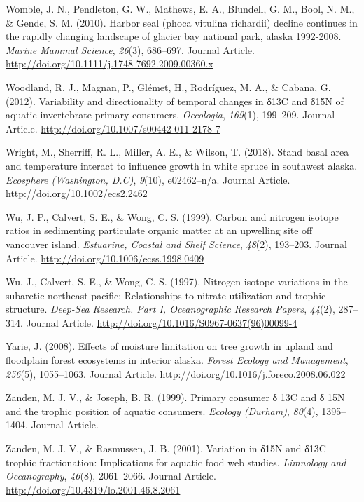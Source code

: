 \documentclass [11pt, proquest] {uwthesis}[2015/03/03]
\begin{document}
\hypertarget{ref-Womble2010}{}
Womble, J. N., Pendleton, G. W., Mathews, E. A., Blundell, G. M., Bool,
N. M., \& Gende, S. M. (2010). Harbor seal (phoca vitulina richardii)
decline continues in the rapidly changing landscape of glacier bay
national park, alaska 1992-2008. \emph{Marine Mammal Science},
\emph{26}(3), 686--697. Journal Article.
\url{http://doi.org/10.1111/j.1748-7692.2009.00360.x}

\hypertarget{ref-Woodland2012}{}
Woodland, R. J., Magnan, P., Glémet, H., Rodríguez, M. A., \& Cabana, G.
(2012). Variability and directionality of temporal changes in δ13C and
δ15N of aquatic invertebrate primary consumers. \emph{Oecologia},
\emph{169}(1), 199--209. Journal Article.
\url{http://doi.org/10.1007/s00442-011-2178-7}

\hypertarget{ref-Wright2018}{}
Wright, M., Sherriff, R. L., Miller, A. E., \& Wilson, T. (2018). Stand
basal area and temperature interact to influence growth in white spruce
in southwest alaska. \emph{Ecosphere (Washington, D.C)}, \emph{9}(10),
e02462--n/a. Journal Article. \url{http://doi.org/10.1002/ecs2.2462}

\hypertarget{ref-Wu1999}{}
Wu, J. P., Calvert, S. E., \& Wong, C. S. (1999). Carbon and nitrogen
isotope ratios in sedimenting particulate organic matter at an upwelling
site off vancouver island. \emph{Estuarine, Coastal and Shelf Science},
\emph{48}(2), 193--203. Journal Article.
\url{http://doi.org/10.1006/ecss.1998.0409}

\hypertarget{ref-Wu1997}{}
Wu, J., Calvert, S. E., \& Wong, C. S. (1997). Nitrogen isotope
variations in the subarctic northeast pacific: Relationships to nitrate
utilization and trophic structure. \emph{Deep-Sea Research. Part I,
Oceanographic Research Papers}, \emph{44}(2), 287--314. Journal Article.
\url{http://doi.org/10.1016/S0967-0637(96)00099-4}

\hypertarget{ref-Yarie2008}{}
Yarie, J. (2008). Effects of moisture limitation on tree growth in
upland and floodplain forest ecosystems in interior alaska. \emph{Forest
Ecology and Management}, \emph{256}(5), 1055--1063. Journal Article.
\url{http://doi.org/10.1016/j.foreco.2008.06.022}

\hypertarget{ref-VanderZanden1999}{}
Zanden, M. J. V., \& Joseph, B. R. (1999). Primary consumer δ 13C and δ
15N and the trophic position of aquatic consumers. \emph{Ecology
(Durham)}, \emph{80}(4), 1395--1404. Journal Article.

\hypertarget{ref-VanderZanden2001}{}
Zanden, M. J. V., \& Rasmussen, J. B. (2001). Variation in δ15N and δ13C
trophic fractionation: Implications for aquatic food web studies.
\emph{Limnology and Oceanography}, \emph{46}(8), 2061--2066. Journal
Article. \url{http://doi.org/10.4319/lo.2001.46.8.2061}
\end{document}
